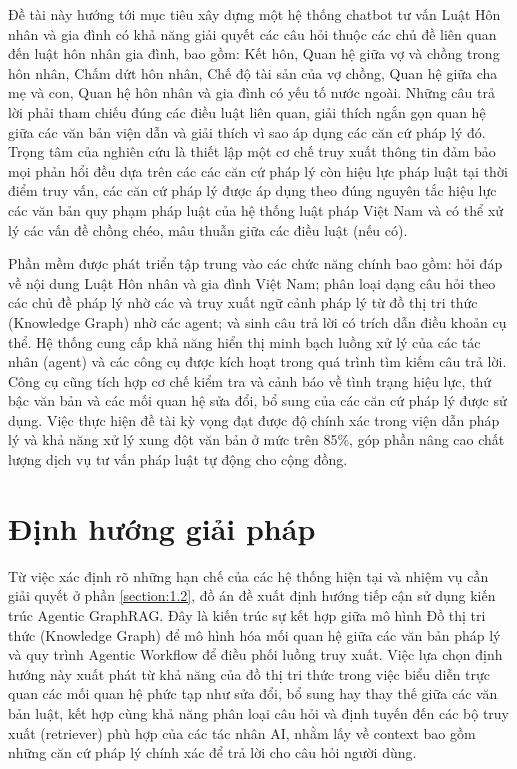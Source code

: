 \documentclass[../DoAn.tex]{subfiles}
\begin{document}
Đề tài này hướng tới mục tiêu xây dựng một hệ thống chatbot tư vấn Luật Hôn nhân và gia đình có khả năng giải quyết các câu hỏi thuộc các chủ đề liên quan đến luật hôn nhân gia đình, bao gồm: Kết hôn, Quan hệ giữa vợ và chồng trong hôn nhân, Chấm dứt hôn nhân, Chế độ tài sản của vợ chồng, Quan hệ giữa cha mẹ và con, Quan hệ hôn nhân và gia đình có yếu tố nước ngoài. Những câu trả lời phải tham chiếu đúng các điều luật liên quan, giải thích ngắn gọn quan hệ giữa các văn bản viện dẫn và giải thích vì sao áp dụng các căn cứ pháp lý đó. Trọng tâm của nghiên cứu là thiết lập một cơ chế truy xuất thông tin đảm bảo mọi phản hổi đều dựa trên các các căn cứ pháp lý còn hiệu lực pháp luật tại thời điểm truy vấn, các căn cứ pháp lý được áp dụng theo đúng nguyên tắc hiệu lực các văn bản quy phạm pháp luật của hệ thống luật pháp Việt Nam và có thể xử lý các vấn đề chồng chéo, mâu thuẫn giữa các điều luật (nếu có).

Phần mềm được phát triển tập trung vào các chức năng chính bao gồm: hỏi đáp về nội dung Luật Hôn nhân và gia đình Việt Nam; phân loại dạng câu hỏi theo các chủ đề pháp lý nhờ các và truy xuất ngữ cảnh pháp lý từ đồ thị tri thức (Knowledge Graph) nhờ các agent; và sinh câu trả lời có trích dẫn điều khoản cụ thể. Hệ thống cung cấp khả năng hiển thị minh bạch luồng xử lý của các tác nhân (agent) và các công cụ được kích hoạt trong quá trình tìm kiếm câu trả lời. Công cụ cũng tích hợp cơ chế kiểm tra và cảnh báo về tình trạng hiệu lực, thứ bậc văn bản và các mối quan hệ sửa đổi, bổ sung của các căn cứ pháp lý được sử dụng. Việc thực hiện đề tài kỳ vọng đạt được độ chính xác trong viện dẫn pháp lý và khả năng xử lý xung đột văn bản ở mức trên 85\%, góp phần nâng cao chất lượng dịch vụ tư vấn pháp luật tự động cho cộng đồng.

\section{Định hướng giải pháp}
\label{section:1.3}

Từ việc xác định rõ những hạn chế của các hệ thống hiện tại và nhiệm vụ cần giải quyết ở phần \ref{section:1.2}, đồ án đề xuất định hướng tiếp cận sử dụng kiến trúc Agentic GraphRAG. Đây là kiến trúc sự kết hợp giữa mô hình Đồ thị tri thức (Knowledge Graph) để mô hình hóa mối quan hệ giữa các văn bản pháp lý và quy trình Agentic Workflow để điều phối luồng truy xuất. Việc lựa chọn định hướng này xuất phát từ khả năng của đồ thị tri thức trong việc biểu diễn trực quan các mối quan hệ phức tạp như sửa đổi, bổ sung hay thay thế giữa các văn bản luật, kết hợp cùng khả năng phân loại câu hỏi và định tuyến đến các bộ truy xuất (retriever) phù hợp của các tác nhân AI, nhằm lấy về context bao gồm những căn cứ pháp lý chính xác để trả lời cho câu hỏi người dùng.
\end{document}
